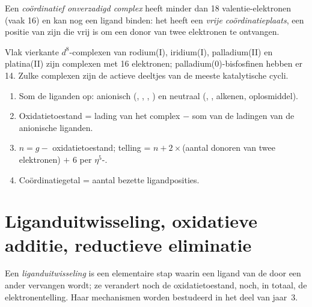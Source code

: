 \begin{definition}\label{def:b2:catalytic-cycles:unsaturated}
Een \emph{coördinatief onverzadigd complex}
heeft minder dan 18 valentie-elektronen (vaak 16) en kan nog een ligand binden: het heeft een
\emph{vrije coördinatieplaats}, een positie van zijn  die vrij is
om een donor van twee elektronen te ontvangen.
\end{definition}

Vlak vierkante $d^8$-complexen van rodium(I), iridium(I), palladium(II) en
platina(II) zijn complexen met 16 elektronen; palladium(0)-bisfosfinen  hebben er 14.
Zulke complexen zijn de actieve deeltjes van de meeste katalytische cycli.

\begin{method}\label{met:b2:catalytic-cycles:count-organometallic}
\begin{enumerate}
  \item Som de liganden op: anionisch (, , , ) en neutraal
        (, , alkenen, oplosmiddel).
  \item Oxidatietoestand = lading van het complex $-$ som van de ladingen van de anionische liganden.
  \item $n = g -$ oxidatietoestand; telling = $n + 2 \times$(aantal donoren van twee elektronen)
        $+$ 6 per $\eta^5$-.
  \item Coördinatiegetal = aantal bezette ligandposities.
\end{enumerate}
\end{method}

\section{Liganduitwisseling, oxidatieve additie, reductieve eliminatie}

\begin{definition}[Liganduitwisseling]\label{def:b2:catalytic-cycles:ligand-exchange}
Een \emph{liganduitwisseling} is een elementaire stap waarin een ligand van
de  door een ander vervangen wordt; ze verandert noch de oxidatietoestand,
noch, in totaal, de elektronentelling. Haar mechanismen worden bestudeerd in het deel van jaar~3.
\end{definition}

